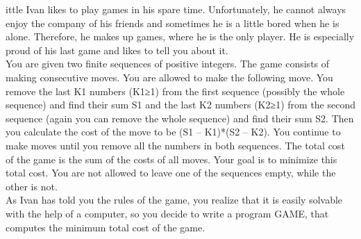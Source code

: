 ittle Ivan likes to play games in his spare time. Unfortunately, he cannot always enjoy the company of his friends and sometimes he is a little bored when he is alone. Therefore, he makes up games, where he is the only player. He is especially proud of his last game and likes to tell you about it. 
\\

 You are given two finite sequences of positive integers. The game consists of making consecutive moves. You are allowed to make the following move. You remove the last K1 numbers (K1≥1) from the first sequence (possibly the whole sequence) and find their sum S1 and the last K2 numbers (K2≥1) from the second sequence (again you can remove the whole sequence) and find their sum S2. Then you calculate the cost of the move to be (S1 – K1)*(S2 – K2). You continue to make moves until you remove all the numbers in both sequences. The total cost of the game is the sum of the costs of all moves. Your goal is to minimize this total cost. You are not allowed to leave one of the sequences empty, while the other is not. 
\\

 As Ivan has told you the rules of the game, you realize that it is easily solvable with the help of a computer, so you decide to write a program GAME, that computes the minimum total cost of the game.